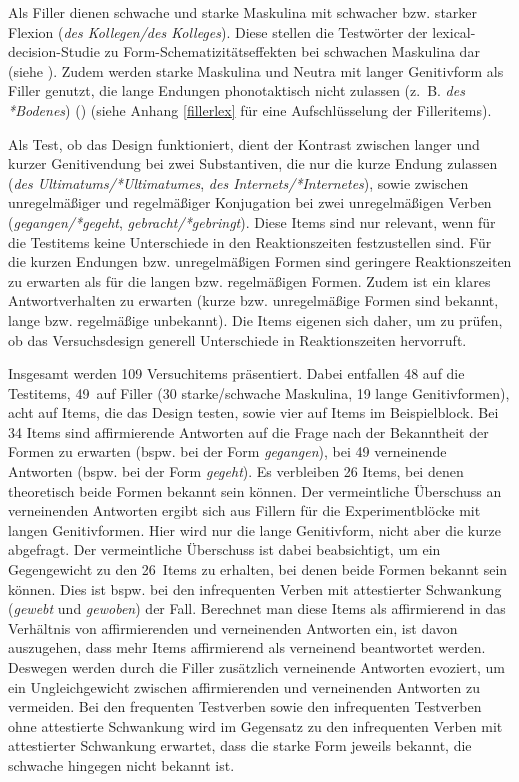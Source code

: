  

Als Filler dienen schwache und starke Maskulina mit schwacher bzw. starker Flexion (\textit{des Kollegen/des Kolleges}). Diese stellen die Testwörter der lexical-decision-Studie zu Form-Schematizitätseffekten bei schwachen Maskulina dar (siehe ). Zudem werden starke Maskulina und Neutra mit langer Genitivform als Filler genutzt, die lange Endungen phonotaktisch nicht zulassen (z.~B. \textit{des *Bodenes}) (\cite[107--108]{Szczepaniak.2010}) (siehe Anhang \ref{fillerlex} für eine Aufschlüsselung der Filleritems). 



Als Test, ob das Design funktioniert, dient der Kontrast zwischen langer und kurzer Genitiv\-endung bei zwei Substantiven, die nur die kurze Endung zulassen (\textit{des Ultimatums/*Ultima\-tumes}, \textit{des Internets/*Internetes}), sowie zwischen unregelmäßiger und regelmäßiger Konjugation bei zwei unregelmäßigen Verben (\textit{gegangen/*gegeht}, \textit{gebracht/*gebringt}). Diese Items sind nur relevant, wenn für die Testitems keine Unterschiede in den Reaktionszeiten festzustellen sind. Für die kurzen Endungen bzw. unregelmäßigen Formen sind geringere Reak\-tionszeiten zu erwarten als für die langen bzw. regelmäßigen Formen. Zudem ist ein klares Antwortverhalten zu erwarten (kurze bzw. unregelmäßige Formen sind bekannt, lange bzw. regelmäßige unbekannt). Die Items eigenen sich daher, um zu prüfen, ob das Versuchsdesign generell Unterschiede in Reaktionszeiten hervorruft. 

Insgesamt werden 109 Versuchitems präsentiert. Dabei entfallen 48 auf die Testitems, 49~auf Filler (30 starke/schwache Maskulina, 19 lange Genitivformen), acht auf Items, die das Design testen, sowie vier auf Items im Beispielblock. Bei 34 Items sind affirmierende Antworten auf die Frage nach der Bekanntheit der Formen zu erwarten (bspw. bei der Form \textit{gegangen}), bei 49 verneinende Antworten (bspw. bei der Form \textit{gegeht}). Es verbleiben 26 Items, bei denen theoretisch beide Formen bekannt sein können. Der vermeintliche Überschuss an verneinenden Antworten ergibt sich aus Fillern für die Experimentblöcke mit langen Genitivformen. Hier wird nur die lange Genitivform, nicht aber die kurze abgefragt. Der vermeintliche Überschuss ist dabei beabsichtigt, um ein Gegengewicht zu den 26~Items zu erhalten, bei denen beide Formen bekannt sein können. Dies ist bspw. bei den infrequenten Verben mit attestierter Schwankung (\textit{gewebt} und \textit{gewoben}) der Fall. Berechnet man diese Items als affirmierend in das Verhältnis von affirmierenden und verneinenden Antworten ein, ist davon auszugehen, dass mehr Items affirmierend als verneinend beantwortet werden. Deswegen werden durch die Filler zusätzlich verneinende Antworten evoziert, um ein Ungleichgewicht zwischen affirmierenden und verneinenden Antworten zu vermeiden. Bei den frequenten Testverben sowie den infrequenten Testverben ohne attestierte Schwankung wird im Gegensatz zu den infrequenten Verben mit attestierter Schwankung erwartet, dass die starke Form jeweils bekannt, die schwache hingegen nicht bekannt ist.  

